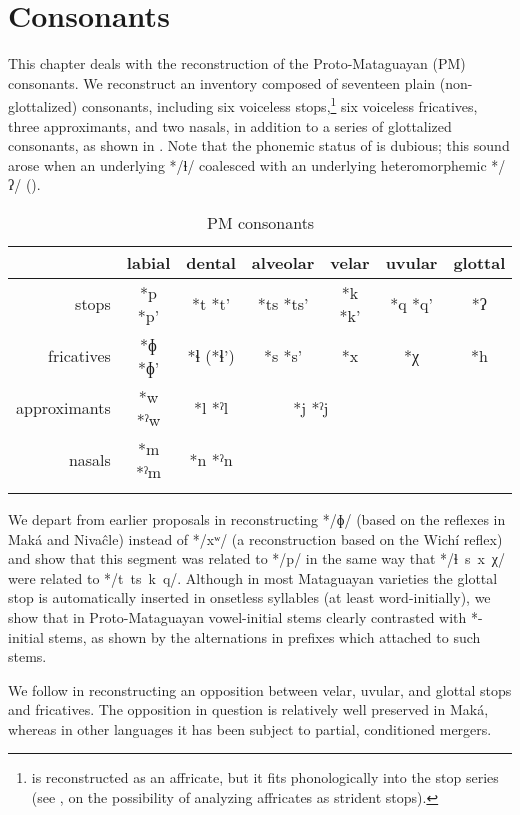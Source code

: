 \chapter{Consonants}\label{pm-consonants}
This chapter deals with the reconstruction of the Proto-Mataguayan (PM) consonants. We reconstruct an inventory composed of seventeen plain (non-glottal\-ized) consonants, including six voiceless stops,\footnote{ is reconstructed as an affricate, but it fits phonologically into the stop series (see ,  on the possibility of analyzing affricates as strident stops).} six voiceless fricatives, three approximants, and two nasals, in addition to a series of glottalized consonants, as shown in . Note that the phonemic status of  is dubious; this sound arose when an underlying */ɬ/ coalesced with an underlying heteromorphemic */ʔ/ ().

\begin{table}
\caption{PM consonants}
\label{PM-inv-cons}
 \begin{tabular}{rcccccc}
  \lsptoprule
            & labial & dental & alveolar & velar & uvular & glottal\\\midrule
  stops & *p *p’ & *t *t’ & *ts *ts’ & *k *k’ & *q *q’ & *ʔ\\
  fricatives & *ɸ *ɸ’ & *ɬ (*ɬ’) & *s *s’ & *x & *χ & *h\\
  approximants & *w *ˀw & *l *ˀl & \multicolumn{2}{c}{*j *ˀj} & &\\
  nasals & *m *ˀm & *n *ˀn &  & & &\\
  \lspbottomrule
 \end{tabular}
\end{table}

We depart from earlier proposals in reconstructing */ɸ/ (based on the reflexes in Maká and Nivaĉle) instead of */xʷ/ (a reconstruction based on the Wichí reflex) and show that this segment was related to */p/ in the same way that */ɬ~s~x~χ/ were related to */t~ts~k~q/. Although in most Mataguayan varieties the glottal stop is automatically inserted in onsetless syllables (at least word-initially), we show that in Proto-Mataguayan vowel-initial stems clearly contrasted with *\mbox{-}initial stems, as shown by the alternations in prefixes which attached to such stems.

We follow \citet{PVB02} in reconstructing an opposition between velar, uvular, and glottal stops and fricatives. The opposition in question is relatively well preserved in Maká, whereas in other languages it has been subject to partial, conditioned mergers.

